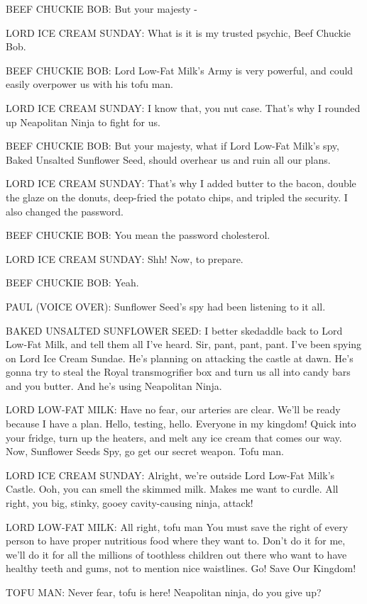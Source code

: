 BEEF CHUCKIE BOB:
But your majesty -

LORD ICE CREAM SUNDAY:
What is it is my trusted psychic, Beef Chuckie Bob.

BEEF CHUCKIE BOB:
Lord Low-Fat Milk's Army is very powerful, and could easily overpower us with his tofu man.

LORD ICE CREAM SUNDAY:
I know that, you nut case.
That's why I rounded up Neapolitan Ninja to fight for us.

BEEF CHUCKIE BOB:
But your majesty, what if Lord Low-Fat Milk's spy, Baked Unsalted Sunflower Seed, should overhear us and ruin all our plans.

LORD ICE CREAM SUNDAY:
That's why I added butter to the bacon, double the glaze on the donuts, deep-fried the potato chips, and tripled the security.
I also changed the password.

BEEF CHUCKIE BOB:
You mean the password cholesterol.

LORD ICE CREAM SUNDAY:
Shh!
Now, to prepare.

BEEF CHUCKIE BOB:
Yeah.

PAUL (VOICE OVER):
Sunflower Seed's spy had been listening to it all.

BAKED UNSALTED SUNFLOWER SEED:
I better skedaddle back to Lord Low-Fat Milk, and tell them all I've heard.
Sir, pant, pant, pant.
I've been spying on Lord Ice Cream Sundae.
He's planning on attacking the castle at dawn.
He's gonna try to steal the Royal transmogrifier box and turn us all into candy bars and you butter.
And he's using Neapolitan Ninja.

LORD LOW-FAT MILK:
Have no fear, our arteries are clear.
We'll be ready because I have a plan.
Hello, testing, hello.
Everyone in my kingdom!
Quick into your fridge, turn up the heaters, and melt any ice cream that comes our way.
Now, Sunflower Seeds Spy, go get our secret weapon.
Tofu man.

LORD ICE CREAM SUNDAY:
Alright, we're outside Lord Low-Fat Milk's Castle.
Ooh, you can smell the skimmed milk.
Makes me want to curdle.
All right, you big, stinky, gooey cavity-causing ninja, attack!

LORD LOW-FAT MILK:
All right, tofu man
You must save the right of every person to have proper nutritious food where they want to.
Don't do it for me, we'll do it for all the millions of toothless children out there who want to have healthy teeth and gums, not to mention nice waistlines.
Go! Save Our Kingdom!

TOFU MAN:
Never fear, tofu is here!
Neapolitan ninja, do you give up?

